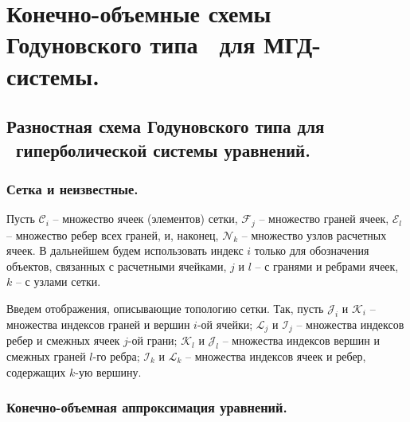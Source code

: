 \documentclass[14pt, a4paper, fleqn]{extreport}
\begin{document}
	\chapter{Конечно-объемные схемы Годуновского типа \
		     для МГД-системы.}

	\section{Разностная схема Годуновского типа для \
			 гиперболической системы уравнений.}

	\subsection{Сетка и неизвестные.}
	
	Пусть 
	$\mathcal{C}_i$ -- множество ячеек (элементов) сетки,
	$\mathcal{F}_j$ -- множество граней ячеек,
	$\mathcal{E}_l$ -- множество ребер всех граней, и, наконец,
	$\mathcal{N}_k$ -- множество узлов расчетных ячеек.
	В дальнейшем будем использовать индекс $i$ только для обозначения объектов, 
	связанных с расчетными ячейками, $j$ и $l$ -- с гранями и ребрами ячеек, $k$ -- с узлами сетки.
	
	Введем отображения, описывающие топологию сетки.
	Так, пусть 
	$\mathcal{J}_i$ и $\mathcal{K}_i$ -- множества индексов граней и вершин $i$-ой ячейки;
	$\mathcal{L}_j$ и $\mathcal{I}_j$ -- множества индексов ребер и смежных ячеек $j$-ой грани;
	$\mathcal{K}_l$ и $\mathcal{J}_l$ -- множества индексов вершин и смежных граней $l$-го ребра;
	$\mathcal{I}_k$ и $\mathcal{L}_k$ -- множества индексов ячеек и ребер, содержащих $k$-ую вершину.
	
	\subsection{Конечно-объемная аппроксимация уравнений.}
	
\end{document}
